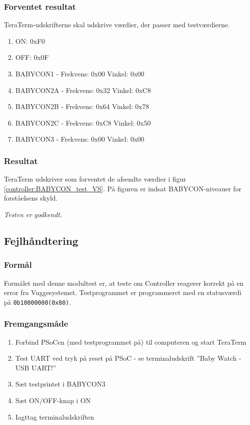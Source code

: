 \subsubsection*{Forventet resultat} 
TeraTerm-udskrifterne skal udskrive værdier, der passer med testværdierne.
\begin{enumerate}
\item ON:  0xF0
\item OFF: 0x0F
\item BABYCON1 -  Frekvens: 0x00 Vinkel: 0x00
\item BABYCON2A - Frekvens: 0x32 Vinkel: 0xC8
\item BABYCON2B - Frekvens: 0x64 Vinkel: 0x78
\item BABYCON2C - Frekvens: 0xC8 Vinkel: 0x50
\item BABYCON3 -  Frekvens: 0x00 Vinkel: 0x00
\end{enumerate}

\subsubsection*{Resultat} 
TeraTerm udskriver som forventet de afsendte værdier i figur \ref{controller:BABYCON_test_VS}. På figuren er indsat BABYCON-niveauer for forståelsens skyld.


\textit{Testen er godkendt.}

\subsection*{Fejlhåndtering}

\subsubsection*{Formål}
Formålet med denne modultest er, at teste om Controller reagerer korrekt på en error fra Vuggesystemet. Testprogrammet er programmeret med en statusværdi på \verb+0b10000000(0x80)+. 

\subsubsection*{Fremgangsmåde}
\begin{enumerate}
\item Forbind PSoCen (med testprogrammet på) til computeren og start TeraTerm
\item Test UART ved tryk på reset på PSoC - se terminaludskrift ''Baby Watch - USB UART!''
\item Sæt testprintet i BABYCON3
\item Sæt ON/OFF-knap i ON
\item Iagttag terminaludskriften
\end{enumerate}

